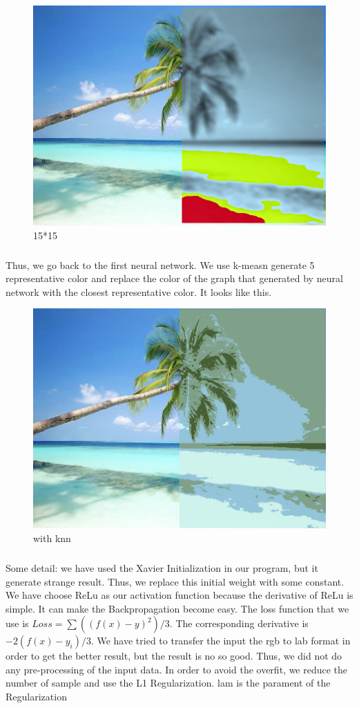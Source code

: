 \documentclass[10pt]{article}
\begin{document}
\begin{figure}[h]
  \centering
  \includegraphics*[scale=0.25]{15.png}
\caption{ 15*15 }
\end{figure}
\pagebreak
\subparagraph{}
Thus, we go back to the first neural network. We use k-measn generate 5 representative color and replace the color of the graph that generated by neural network with the closest representative color.
It looks like this.
\begin{figure}[h]
  \centering
  \includegraphics*[scale=0.25]{final+knn.png}
\caption{ with knn }
\end{figure}
\pagebreak
\subparagraph{}
Some detail: we have used the Xavier Initialization in our program, but it generate strange result. Thus, we replace this initial weight with some constant. We have choose ReLu as our activation function because the derivative of ReLu is simple. It can make the Backpropagation become easy. The loss function that we use is $Loss=\sum((f(x)-y)^2)/3$. The corresponding derivative is $-2(f(x)-y_i)/3$. We have tried to transfer the input the rgb to lab format in order to get the better result, but the result is no so good. Thus, we did not do any pre-processing of the input data. In order to avoid the overfit, we reduce the number of sample and use the L1 Regularization. lam is the parament of the Regularization
\end{document}
